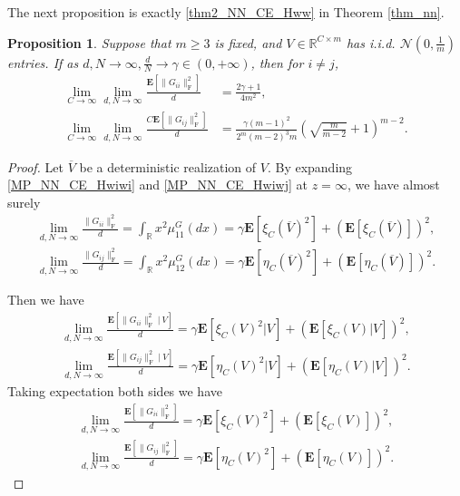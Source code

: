 \documentclass{article}
\newcommand{\R}{\mathbb{R}}
\newcommand{\E}{\mathbf{E}}
\newcommand\ml{\mathcal}
\newcommand{\rw}{\rightarrow}
\newcommand{\1}{^{(1)}}
\newcommand{\2}{^{(2)}}
\renewcommand{\l}{\left}
\renewcommand{\r}{\right}
\newtheorem{prop}{Proposition}
\newcommand{\bea}{\begin{equation}\begin{aligned}}
\newcommand{\eea}{\end{aligned}\end{equation}}
\begin{document}
The next proposition is exactly \eqref{thm2_NN_CE_Hww} in Theorem \ref{thm_nn}.
\begin{prop}
    Suppose that $m\geq 3$ is fixed, and $V\in\R^{C\times m}$ has i.i.d. $\ml{N}(0,\frac{1}{m})$ entries. If as $d,N\rw\infty, \frac
    {d}{N}\rw \gamma\in (0,+\infty)$, then for $i\ne j$, 
    \bea
\lim_{C\rw\infty}\lim_{d,N\rw\infty}\frac{\E\l[\|G_{ii}\|_{\operatorname{F}}^2\r]}{d}&=\frac{2\gamma+1}{4m^2},\\
\lim_{C\rw\infty}\lim_{d,N\rw\infty}\frac{C\E\l[\|G_{ij}\|_{\operatorname{F}}^2\r]}{d}&=\frac{\gamma(m-1)^2}{2^m(m-2)^3m}\l(\sqrt{\frac{m}{m-2}}+1\r)^{m-2}.
        \eea
\end{prop}
\begin{proof}
Let $\overline{V}$ be a deterministic realization of $V$. By expanding \eqref{MP_NN_CE_Hwiwi} and \eqref{MP_NN_CE_Hwiwj} at $z=\infty$, we have almost surely 
\bea
\lim_{d,N\rw\infty}\frac{\|G_{ii}\|_{\operatorname{F}}^2}{d}=\int_\R x^2\mu_{11}^G(dx)=\gamma\E[\xi_C(\overline{V})^2]+(\E[\xi_C(\overline{V})])^2,
\eea
\bea
\lim_{d,N\rw\infty}\frac{\|G_{ij}\|_{\operatorname{F}}^2}{d}=\int_\R x^2\mu_{12}^G(dx)=\gamma\E[\eta_C(\overline{V})^2]+(\E[\eta_C(\overline{V})])^2.
\eea

Then we have
\bea
\lim_{d,N\rw\infty}\frac{\E\l[\|G_{ii}\|_{\operatorname{F}}^2\ |\ V\r]}{d}=\gamma\E[\xi_C(V)^2|V]+(\E[\xi_C(V)|V])^2,
\eea
\bea
\lim_{d,N\rw\infty}\frac{\E\l[\|G_{ij}\|_{\operatorname{F}}^2\ |\ V\r]}{d}=\gamma\E[\eta_C(V)^2|V]+(\E[\eta_C(V)|V])^2.
\eea
Taking expectation both sides we have
\bea\label{eqRHShii}
\lim_{d,N\rw\infty}\frac{\E\l[\|G_{ii}\|_{\operatorname{F}}^2\r]}{d}=\gamma\E[\xi_C(V)^2]+(\E[\xi_C(V)])^2,
\eea
\bea\label{eqRHShij}
\lim_{d,N\rw\infty}\frac{\E\l[\|G_{ij}\|_{\operatorname{F}}^2\r]}{d}=\gamma\E[\eta_C(V)^2]+(\E[\eta_C(V)])^2.
\eea


\end{proof}
\end{document}
